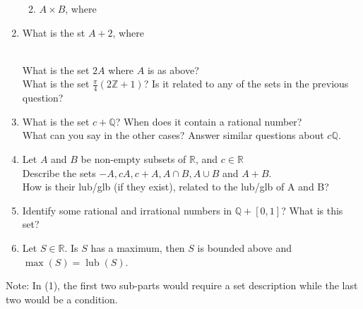 \begin{enumerate}[label = (\arabic*)]
\begin{enumerate}
        \item $A \times B$, where
        \begin{enumerate*}[label=(\roman*)]
            \item $A = [0, \infty)$ and $B = [2, 3]$.
            \item $A = [3, 4]$ and $B = \mathbb{N}$.
        \end{enumerate*}
    \end{enumerate}
    \item What is the st $A+2$, where
    \begin{enumerate*}[label=(\roman*)]
        \item $A = \mathbb{Z}$
        \item $A = \{1, 2, 3, 4\}$
        \item $A = [1, 2)$
        \item $A = (\infty, 0)$
    \end{enumerate*}\\
    What is the set $2A$ where $A$ is as above?\\
    What is the set $\frac{\pi}{4}(2\mathbb{Z} + 1)$? Is it related to any of the sets in the previous question?
    \item What is the set $c + \mathbb{Q}$? When does it contain a rational number?\\
    What can you say in the other cases? Answer similar questions about $c\mathbb{Q}$.
    \item Let $A$ and $B$ be non-empty subsets of $\mathbb{R}$, and $c \in \mathbb{R}$\\
    Describe the sets $-A, cA, c+A, A\cap B, A\cup B$ and $A+B$.\\
    How is their lub/glb (if they exist), related to the lub/glb of A and B?
    \item Identify some rational and irrational numbers in $\mathbb{Q} + [0, 1]$? What is this set?
    \item Let $S \in \mathbb{R}$. Is $S$ has a maximum, then $S$ is bounded above and $\operatorname{max}(S) = \operatorname{lub}(S)$.
\end{enumerate}

\hrulefill

Note: In (1), the first two sub-parts would require a set description while the last two would be a condition.
